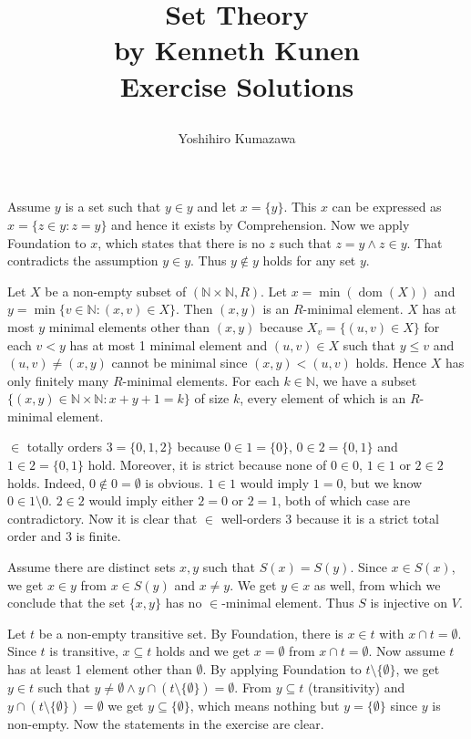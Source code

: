 \documentclass[12pt]{article}
\title{
  \vspace{-2cm}
  Set Theory \\
  \large by Kenneth Kunen \\
  Exercise Solutions
  \author{Yoshihiro Kumazawa}
}
\newcommand{\dom}{\mathop{\mathrm{dom}}}
\theoremstyle{definition}
\newenvironment{customthm}[1]
  {\renewcommand\theinnercustomthm{#1}\innercustomthm}
  {\endinnercustomthm}
\begin{document}
\maketitle

\begin{customthm}{I.4.18}
  Assume $y$ is a set such that $y\in y$ and let $x=\{y\}$. This $x$ can be expressed as $x=\{z\in y:z=y\}$ and hence it exists by Comprehension. Now we apply Foundation to $x$, which states that there is no $z$ such that $z=y\wedge z\in y$. That contradicts the assumption $y\in y$. Thus $y\not\in y$ holds for any set $y$.
\end{customthm}

\begin{customthm}{I.6.23}
  Let $X$ be a non-empty subset of $(\mathbb{N}\times\mathbb{N},R)$. Let $x=\min(\dom(X))$ and $y=\min\{v\in\mathbb{N}:(x,v)\in X\}$. Then $(x,y)$ is an $R$-minimal element. $X$ has at most $y$ minimal elements other than $(x,y)$ because $X_v=\{(u,v)\in X\}$ for each $v<y$ has at most 1 minimal element and $(u,v)\in X$ such that $y\leq v$ and $(u,v)\neq(x,y)$ cannot be minimal since $(x,y)<(u,v)$ holds. Hence $X$ has only finitely many $R$-minimal elements. For each $k\in\mathbb{N}$, we have a subset $\{(x,y)\in\mathbb{N}\times\mathbb{N}:x+y+1=k\}$ of size $k$, every element of which is an $R$-minimal element.
\end{customthm}

\begin{customthm}{I.6.26}
  $\in$ totally orders $3=\{0,1,2\}$ because $0\in 1=\{0\}$, $0\in 2=\{0,1\}$ and $1\in 2=\{0,1\}$ hold. Moreover, it is strict because none of $0\in 0$, $1\in 1$ or $2\in 2$ holds. Indeed, $0\not\in 0=\emptyset$ is obvious. $1\in 1$ would imply $1=0$, but we know $0\in 1\setminus0$. $2\in 2$ would imply either $2=0$ or $2=1$, both of which case are contradictory. Now it is clear that $\in$ well-orders $3$ because it is a strict total order and $3$ is finite.
\end{customthm}

\begin{customthm}{I.6.29}
  Assume there are distinct sets $x,y$ such that $S(x)=S(y)$. Since $x\in S(x)$, we get $x\in y$ from $x\in S(y)$ and $x\neq y$. We get $y\in x$ as well, from which we conclude that the set $\{x,y\}$ has no $\in$-minimal element. Thus $S$ is injective on $V$.
\end{customthm}

\begin{customthm}{I.7.2}
  Let $t$ be a non-empty transitive set. By Foundation, there is $x\in t$ with $x\cap t=\emptyset$. Since $t$ is transitive, $x\subseteq t$ holds and we get $x=\emptyset$ from $x\cap t=\emptyset$. Now assume $t$ has at least 1 element other than $\emptyset$. By applying Foundation to $t\setminus\{\emptyset\}$, we get $y\in t$ such that $y\neq\emptyset\wedge y\cap(t\setminus\{\emptyset\})=\emptyset$. From $y\subseteq t$ (transitivity) and $y\cap(t\setminus\{\emptyset\})=\emptyset$ we get $y\subseteq\{\emptyset\}$, which means nothing but $y=\{\emptyset\}$ since $y$ is non-empty. Now the statements in the exercise are clear.
\end{customthm}
\end{document}
